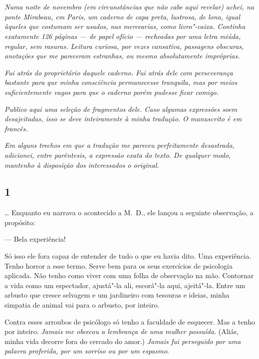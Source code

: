 \chapter*{}

\emph{Numa noite de novembro (em circunstâncias que não cabe aqui
revelar) achei, na ponte Mirabeau, em Paris, um caderno de capa preta,
lustrosa, de lona, igual àqueles que costumam ser usados, nas
mercearias, como livro"-caixa. Continha exatamente 126 páginas --- de papel
ofício --- recheadas por uma letra miúda, regular, sem rasuras. Leitura
curiosa, por vezes cansativa, passagens obscuras, anotações que me
pareceram estranhas, ou mesmo absolutamente impróprias.}

\emph{Fui atrás do proprietário daquele caderno. Fui atrás dele com
perseverança bastante para que minha consciência permanecesse tranquila,
mas por meios suficientemente vagos para que o caderno porém pudesse
ficar comigo.}

\emph{Publico aqui uma seleção de fragmentos dele. Caso algumas
expressões soem desajeitadas, isso se deve inteiramente à minha
tradução. O manuscrito é em francês.}

\emph{Em alguns trechos em que a tradução me pareceu perfeitamente
desastrada, adicionei, entre parêntesis, a expressão exata do texto. De
qualquer modo, mantenho à disposição dos interessados o original.}

\pagebreak

\section{1}

\ldots{} Enquanto eu narrava o acontecido a M.~D., ele lançou a seguinte
observação, a propósito:

--- Bela experiência!

Só isso ele fora capaz de entender de tudo o que eu havia dito. Uma
experiência. Tenho horror a esse termo. Serve bem para os seus
exercícios de psicologia aplicada. Não tenho como viver com uma folha de
observação na mão. Contornar a vida como um espectador, ajustá"-la ali,
escorá"-la aqui, ajeitá"-la. Entre um arbusto que cresce selvagem e um
jardineiro com tesouras e ideias, minha simpatia de animal vai para o
arbusto, por inteiro.

Contra esses arroubos de psicólogo só tenho a faculdade de esquecer. Mas
a tenho por inteiro. \emph{Jamais me obcecou a lembrança de uma mulher
possuída}. (Aliás, minha vida decorre fora do cercado do amor.)
\emph{Jamais fui perseguido por uma palavra proferida, por um sorriso ou
por um espasmo}.

